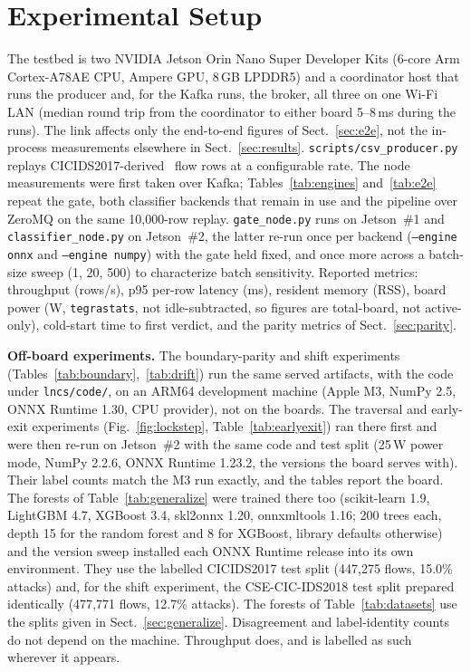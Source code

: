 \documentclass[runningheads]{llncs}
\begin{document}
\section{Experimental Setup}

The testbed is two NVIDIA Jetson Orin Nano Super Developer Kits (6-core Arm Cortex-A78AE CPU, Ampere GPU, 8\,GB LPDDR5) and a coordinator host that runs the producer and, for the Kafka runs, the broker, all three on one Wi-Fi LAN (median round trip from the coordinator to either board 5--8\,ms during the runs). The link affects only the end-to-end figures of Sect.~\ref{sec:e2e}, not the in-process measurements elsewhere in Sect.~\ref{sec:results}. \texttt{scripts/csv\_producer.py} replays CICIDS2017-derived~\cite{sharafaldin2018toward} flow rows at a configurable rate. The node measurements were first taken over Kafka; Tables~\ref{tab:engines} and~\ref{tab:e2e} repeat the gate, both classifier backends that remain in use and the pipeline over ZeroMQ on the same 10{,}000-row replay. \texttt{gate\_node.py} runs on Jetson~\#1 and \texttt{classifier\_node.py} on Jetson~\#2, the latter re-run once per backend (\texttt{--engine onnx} and \texttt{--engine numpy}) with the gate held fixed, and once more across a batch-size sweep (1, 20, 500) to characterize batch sensitivity. Reported metrics: throughput (rows/s), p95 per-row latency (ms), resident memory (RSS), board power (W, \texttt{tegrastats}, not idle-subtracted, so figures are total-board, not active-only), cold-start time to first verdict, and the parity metrics of Sect.~\ref{sec:parity}.

\textbf{Off-board experiments.} The boundary-parity and shift experiments (Tables~\ref{tab:boundary},~\ref{tab:drift}) run the same served artifacts, with the code under \texttt{lncs/code/}, on an ARM64 development machine (Apple M3, NumPy 2.5, ONNX Runtime 1.30, CPU provider), not on the boards. The traversal and early-exit experiments (Fig.~\ref{fig:lockstep}, Table~\ref{tab:earlyexit}) ran there first and were then re-run on Jetson~\#2 with the same code and test split (25\,W power mode, NumPy 2.2.6, ONNX Runtime 1.23.2, the versions the board serves with). Their label counts match the M3 run exactly, and the tables report the board. The forests of Table~\ref{tab:generalize} were trained there too (scikit-learn 1.9, LightGBM 4.7, XGBoost 3.4, skl2onnx 1.20, onnxmltools 1.16; 200 trees each, depth 15 for the random forest and 8 for XGBoost, library defaults otherwise) and the version sweep installed each ONNX Runtime release into its own environment. They use the labelled CICIDS2017 test split (447{,}275 flows, 15.0\% attacks) and, for the shift experiment, the CSE-CIC-IDS2018 test split prepared identically (477{,}771 flows, 12.7\% attacks). The forests of Table~\ref{tab:datasets} use the splits given in Sect.~\ref{sec:generalize}. Disagreement and label-identity counts do not depend on the machine. Throughput does, and is labelled as such wherever it appears.
\end{document}
